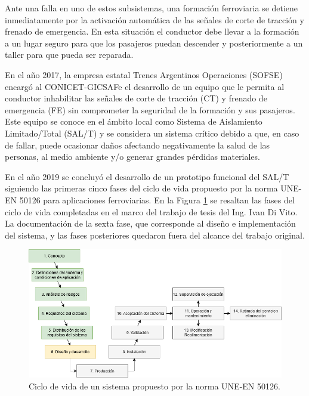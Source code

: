 \documentclass[11pt]{charter}
\begin{document}
Ante una falla en uno de estos subsistemas, una formación ferroviaria se detiene inmediatamente por la activación 
automática de las señales de corte de tracción y frenado de emergencia. En esta situación el conductor debe llevar a la 
formación a un lugar seguro para que los pasajeros puedan descender y posteriormente a un taller para que pueda ser 
reparada.

En el año 2017, la empresa estatal Trenes Argentinos Operaciones (SOFSE) encargó al CONICET-GICSAFe el desarrollo de un 
equipo que le permita al conductor inhabilitar las señales de corte de tracción (CT) y frenado de emergencia (FE) sin comprometer 
la seguridad de la formación y sus pasajeros. Este equipo se conoce en el ámbito local como Sistema de Aislamiento 
Limitado/Total (SAL/T) y se considera un sistema crítico debido a que, en caso de fallar, puede 
ocasionar daños afectando negativamente la salud de las personas, al medio ambiente y/o generar grandes pérdidas 
materiales.

En el año 2019 se concluyó el desarrollo de un prototipo funcional del SAL/T siguiendo las primeras cinco fases del 
ciclo de vida propuesto por la norma UNE-EN 50126 para aplicaciones ferroviarias. En la Figura 
\ref{fig:ciclo_de_vida_50126} se resaltan las fases del ciclo de vida completadas en el marco del trabajo de tesis del 
Ing. Ivan Di Vito. La documentación de la sexta fase, que corresponde al diseño e implementación del sistema, y las
fases posteriores quedaron fuera del alcance del trabajo original.

\vspace{25px}

\begin{figure}[htpb]
\centering 
\includegraphics[width=1\textwidth]{./Figuras/ciclo_de_vida_50126.png}
\caption{Ciclo de vida de un sistema propuesto por la norma UNE-EN 50126.}
\label{fig:ciclo_de_vida_50126}
\end{figure}
\end{document}
